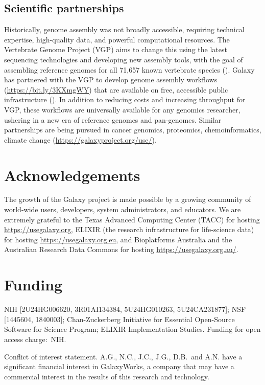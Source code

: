 \subsection*{Scientific partnerships}
Historically, genome assembly was not broadly accessible, requiring technical expertise, high-quality data, and powerful computational resources. The Vertebrate Genome Project (VGP) aims to change this using the latest sequencing technologies and developing new assembly tools, with the goal of assembling reference genomes for all 71,657 known vertebrate species (\cite{Rhie_2021}). Galaxy has partnered with the VGP to develop genome assembly workflows (\url{https://bit.ly/3KXmgWY}) that are available on free, accessible public infrastructure (\cite{batut2018community}). In addition to reducing costs and increasing throughput for VGP, these workflows are universally available for any genomics researcher, ushering in a new era of reference genomes and pan-genomes. Similar partnerships are being pursued in cancer genomics, proteomics, chemoinformatics, climate change (\url{https://galaxyproject.org/use/}).

\section*{Acknowledgements}
The growth of the Galaxy project is made possible by a growing community of world-wide users, developers, system administrators, and educators. We are extremely grateful to the Texas Advanced Computing Center (TACC) for hosting \url{https://usegalaxy.org}, ELIXIR (the research infrastructure for life-science data) for hosting \url{https://usegalaxy.org.eu}, and Bioplatforms Australia and the Australian Research Data Commons for hosting \url{https://usegalaxy.org.au/}.


\section*{Funding}
NIH [2U24HG006620, 3R01AI134384, 5U24HG010263, 5U24CA231877]; NSF [1445604, 1840003]; Chan-Zuckerberg Initiative for Essential Open-Source Software for Science Program; ELIXIR Implementation Studies. Funding for open access charge: NIH.

Conflict of interest statement. A.G., N.C., J.C., J.G., D.B. and A.N. have a significant financial interest in GalaxyWorks, a company that may have a commercial interest in the results of this research and technology.

\footnotesize


\normalsize
